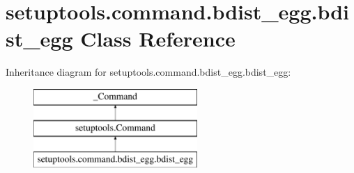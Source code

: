 \hypertarget{classsetuptools_1_1command_1_1bdist__egg_1_1bdist__egg}{}\section{setuptools.\+command.\+bdist\+\_\+egg.\+bdist\+\_\+egg Class Reference}
\label{classsetuptools_1_1command_1_1bdist__egg_1_1bdist__egg}
Inheritance diagram for setuptools.\+command.\+bdist\+\_\+egg.\+bdist\+\_\+egg\+:\begin{figure}[H]
\begin{center}
\leavevmode
\includegraphics[height=3.000000cm]{classsetuptools_1_1command_1_1bdist__egg_1_1bdist__egg}
\end{center}
\end{figure}

